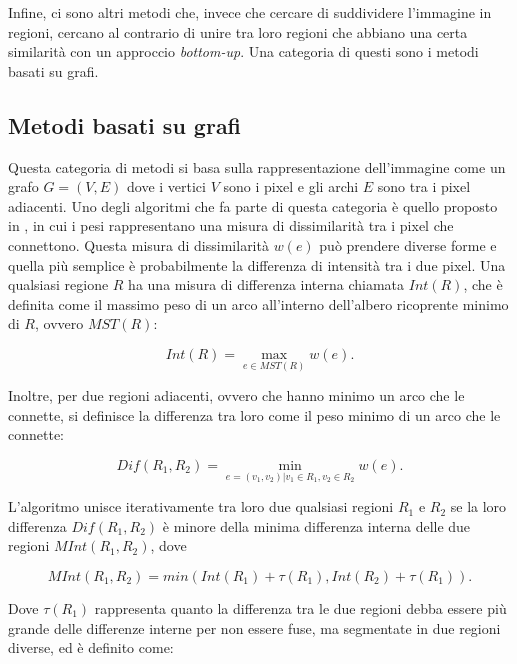 Infine, ci sono altri metodi che, invece che cercare di suddividere l'immagine in regioni, cercano al contrario di unire tra loro regioni che abbiano una certa similarità con un approccio \textit{bottom-up}. Una categoria di questi sono i metodi basati su grafi.




\subsection{Metodi basati su grafi}
\label{metodi_grafi}
Questa categoria di metodi si basa sulla rappresentazione dell'immagine come un grafo $G=(V,E)$ dove i vertici $V$ sono i pixel e gli archi $E$ sono tra i pixel adiacenti. Uno degli algoritmi che fa parte di questa categoria è quello proposto in \cite{graph_segm}, in cui i pesi rappresentano una misura di dissimilarità tra i pixel che connettono. Questa misura di dissimilarità $w(e)$ può prendere diverse forme e quella più semplice è probabilmente la differenza di intensità tra i due pixel. 
Una qualsiasi regione $R$ ha una misura di differenza interna chiamata $Int(R)$, che è definita come il massimo peso di un arco all'interno dell'albero ricoprente minimo di $R$, ovvero $MST(R)$: 

\begin{equation}
    Int(R) = \max_{e\in MST(R)} w(e).
\end{equation}

Inoltre, per due regioni adiacenti, ovvero che hanno minimo un arco che le connette, si definisce la differenza tra loro come il peso minimo di un arco che le connette:

\begin{equation}
    Dif(R_{1}, R_{2}) = \min_{e=(v_{1}, v_{2}) | v_{1} \in R_{1}, v_{2} \in R_{2}} w(e).
\end{equation}

L'algoritmo unisce iterativamente tra loro due qualsiasi regioni $R_{1}$ e $R_{2}$ se la loro differenza $Dif(R_{1}, R_{2})$ è minore della minima differenza interna delle due regioni $MInt(R_{1}, R_{2})$, dove

\begin{equation}
    MInt(R_{1}, R_{2}) = min(Int(R_{1}) + \tau(R_{1}),  Int(R_{2}) + \tau(R_{1})).
\end{equation}

Dove $\tau(R_{1})$ rappresenta quanto la differenza tra le due regioni debba essere più grande delle differenze interne per non essere fuse, ma segmentate in due regioni diverse, ed è definito come:

